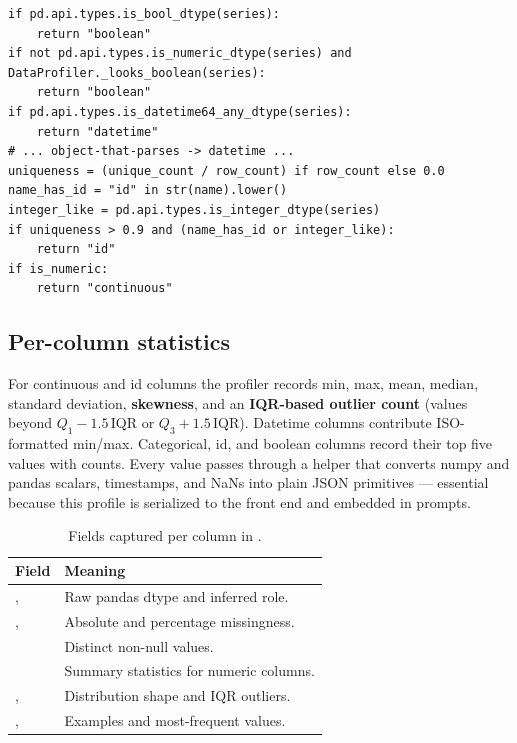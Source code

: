 \begin{lstlisting}[style=py,caption={Excerpt of the semantic-type cascade in \code{DataProfiler}.}]
if pd.api.types.is_bool_dtype(series):
    return "boolean"
if not pd.api.types.is_numeric_dtype(series) and DataProfiler._looks_boolean(series):
    return "boolean"
if pd.api.types.is_datetime64_any_dtype(series):
    return "datetime"
# ... object-that-parses -> datetime ...
uniqueness = (unique_count / row_count) if row_count else 0.0
name_has_id = "id" in str(name).lower()
integer_like = pd.api.types.is_integer_dtype(series)
if uniqueness > 0.9 and (name_has_id or integer_like):
    return "id"
if is_numeric:
    return "continuous"
\end{lstlisting}

\subsection{Per-column statistics}
For continuous and id columns the profiler records min, max, mean, median,
standard deviation, \textbf{skewness}, and an \textbf{IQR-based outlier count}
(values beyond $Q_1 - 1.5\,\mathrm{IQR}$ or $Q_3 + 1.5\,\mathrm{IQR}$). Datetime
columns contribute ISO-formatted min/max. Categorical, id, and boolean columns
record their top five values with counts. Every value passes through a
 helper that converts numpy and pandas scalars, timestamps,
and NaNs into plain JSON primitives --- essential because this profile is
serialized to the front end and embedded in prompts.

\begin{table}[h]
\centering
\caption{Fields captured per column in .}
\small
\begin{tabularx}{\linewidth}{@{}L{4.2cm} X@{}}
\toprule
\textbf{Field} & \textbf{Meaning} \\
\midrule
{},  & Raw pandas dtype and inferred role. \\
,  & Absolute and percentage missingness. \\
 & Distinct non-null values. \\
 & Summary statistics for numeric columns. \\
,  & Distribution shape and IQR outliers. \\
,  & Examples and most-frequent values. \\
\bottomrule
\end{tabularx}
\end{table}

